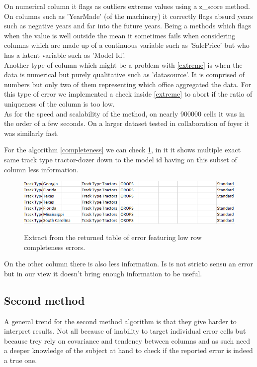 \documentclass{article}
\begin{document}
On numerical column it flags as outliers extreme values using a z\_score method. On columns such as 'YearMade' (of the machinery) it correctly flags absurd years such as negative years and far into the future years. Being a methods which flags when the value is well outside the mean it sometimes fails when considering columns which are made up of a continuous variable such as 'SalePrice' but who has a latent variable such as 'Model Id'. \\ Another type of column which might be a problem with \ref{extreme} is when the data is numerical but purely qualitative such as 'datasource'. It is comprised of numbers but only two of them representing which office aggregated the data. For this type of error we implemented a check inside \ref{extreme} to abort if the ratio of uniqueness of the column is too low.\\
As for the speed and scalability of the method, on nearly 900000 cells it was in the order of a few seconds. On a larger dataset tested in collaboration of foyer it was similarly fast.

For the algorithm \ref{completeness} we can check \ref{fig:exp_completeness}, in it it shows multiple exact same track type tractor-dozer down to the model id having on this subset of column less information.

\begin{figure}[h]
    \centering
    \includegraphics[width=\linewidth]{picture/exp_completeness_db.png}
    \label{fig:exp_completeness}
    \caption{Extract from the returned table of error featuring low row completeness errors.}
\end{figure}
On the other column there is also less information. Is is not stricto sensu an error but in our view it doesn't bring enough information to be useful.

\subsection{Second method}
A general trend for the second method algorithm is that they give harder to interpret results. Not all because of inability to target individual error cells but because trey rely on covariance and tendency between columns and as such need a deeper knowledge of the subject at hand to check if the reported error is indeed a true one.
\end{document}
